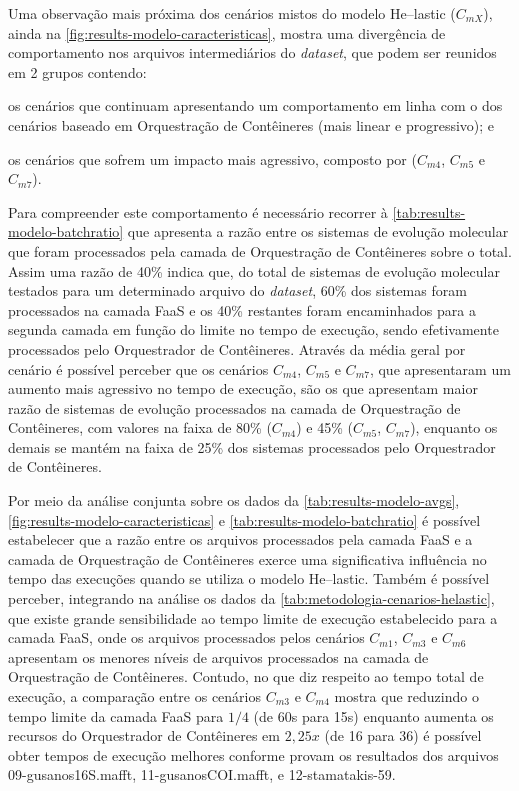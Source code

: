 \documentclass[english,brazilian]{UNISINOSmonografia} %
\begin{document}
Uma observação mais próxima dos cenários mistos do modelo \textsf{He}--lastic ($C_{mX}$), ainda na \autoref{fig:results-modelo-caracteristicas}, mostra uma divergência de comportamento nos arquivos intermediários do \textit{dataset}, que podem ser reunidos em 2 grupos contendo:
\begin{inparaenum} 
	\item os cenários que continuam apresentando um comportamento em linha com o dos cenários baseado em Orquestração de Contêineres (mais linear e progressivo); e
	\item os cenários que sofrem um impacto mais agressivo, composto por ($C_{m4}$, $C_{m5}$ e $C_{m7}$).
\end{inparaenum}
%
Para compreender este comportamento é necessário recorrer à \autoref{tab:results-modelo-batchratio} que apresenta a razão entre os sistemas de evolução molecular que foram processados pela camada de Orquestração de Contêineres sobre o total.
%
Assim uma razão de 40\% indica que, do total de sistemas de evolução molecular testados para um determinado arquivo do \textit{dataset}, 60\% dos sistemas foram processados na camada FaaS e os 40\% restantes foram encaminhados para a segunda camada em função do limite no tempo de execução, sendo efetivamente processados pelo Orquestrador de Contêineres.
%
Através da média geral por cenário é possível perceber que os cenários $C_{m4}$, $C_{m5}$ e $C_{m7}$, que apresentaram um aumento mais agressivo no tempo de execução, são os que apresentam maior razão de sistemas de evolução processados na camada de Orquestração de Contêineres, com valores na faixa de 80\% ($C_{m4}$) e 45\% ($C_{m5}$, $C_{m7}$), enquanto os demais se mantém na faixa de 25\% dos sistemas processados pelo Orquestrador de Contêineres.



Por meio da análise conjunta sobre os dados da \autoref{tab:results-modelo-avgs}, \autoref{fig:results-modelo-caracteristicas} e \autoref{tab:results-modelo-batchratio} é possível estabelecer que a razão entre os arquivos processados pela camada FaaS e a camada de Orquestração de Contêineres exerce uma significativa influência no tempo das execuções quando se utiliza o modelo \textsf{He}--lastic.
%
Também é possível perceber, integrando na análise os dados da \autoref{tab:metodologia-cenarios-helastic}, que existe grande sensibilidade ao tempo limite de execução estabelecido para a camada FaaS, onde os arquivos processados pelos cenários $C_{m1}$, $C_{m3}$ e $C_{m6}$ apresentam os menores níveis de arquivos processados na camada de Orquestração de Contêineres.
%
Contudo, no que diz respeito ao tempo total de execução, a comparação entre os cenários $C_{m3}$ e $C_{m4}$ mostra que reduzindo o tempo limite da camada FaaS para $1/4$ (de 60s para 15s) enquanto aumenta os recursos do Orquestrador de Contêineres em $2,25x$ (de 16 para 36) é possível obter tempos de execução melhores conforme provam os resultados dos arquivos 09-gusanos16S.mafft, 11-gusanosCOI.mafft, e 12-stamatakis-59.
\end{document}
